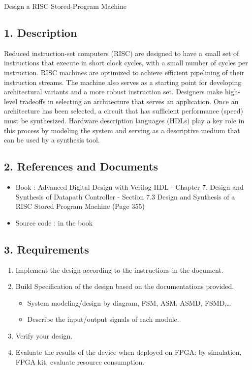 \documentclass{vhdl-assignment}
\begin{document}
\pagebreak
\begin{project}{Design a RISC Stored-Program Machine}
    \subsection*{1. Description}
    Reduced instruction-set computers (RISC) are designed to have a small set of instructions that execute in short clock cycles, with a small number of cycles per instruction.
    RISC machines are optimized to achieve efficient pipelining of their instruction streams.
    The machine also serves as a starting point for developing architectural variants and a more robust instruction set.
    Designers make high-level tradeoffs in selecting an architecture that serves an application.
    Once an architecture has been selected, a circuit that has sufficient performance (speed) must be synthesized.
    Hardware description languages (HDLs) play a key role in this process by modeling the system and serving as a descriptive medium that can be used by a synthesis tool.
    \subsection*{2. References and Documents}
    \begin{itemize}
        \item Book : Advanced Digital Design with Verilog HDL - Chapter 7. Design and Synthesis of Datapath Controller - Section 7.3 Design and Synthesis of a RISC Stored Program Machine (Page 355)
        \item Source code : in the book 
    \end{itemize}
    \subsection*{3. Requirements}
    \begin{enumerate}
        \item Implement the design according to the instructions in the document.
        \item Build Specification of the design based on the documentations provided.
        \begin{itemize}
            \item System modeling/design by diagram, FSM, ASM, ASMD, FSMD,\dots
            \item Describe the input/output signals of each module.
        \end{itemize}
        \item Verify your design.
        \item Evaluate the results of the device when deployed on FPGA: by simulation, FPGA kit, evaluate resource consumption.
    \end{enumerate}
\end{project}
\end{document}
